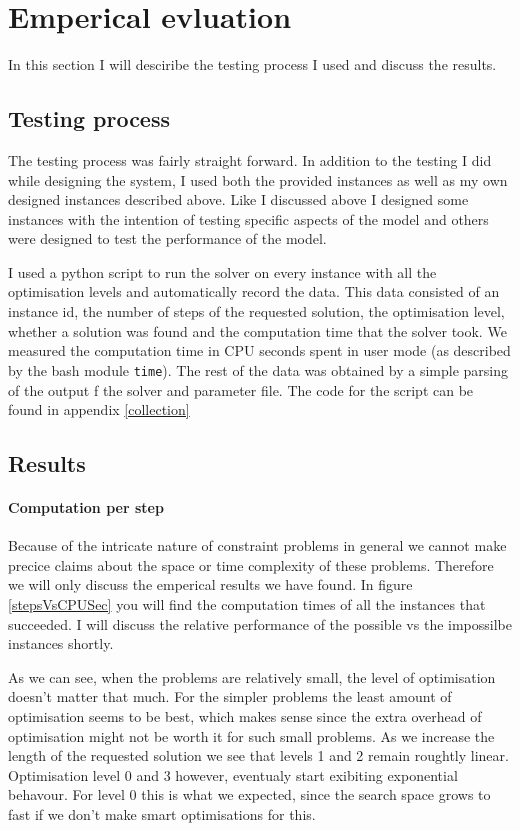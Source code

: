 \documentclass[british]{article}
\newcommand{\code}[1]{\texttt{#1}}
\begin{document}
\section{Emperical evluation}
\label{results}
In this section I will desciribe the testing process I used and discuss the results. 

\subsection{Testing process}
\label{testing}
The testing process was fairly straight forward. In addition to the testing I did while designing the system, I used both the provided instances as well as my own designed instances described above. Like I discussed above I designed some instances with the intention of testing specific aspects of the model and others were designed to test the performance of the model. 

I used a python script to run the solver on every instance with all the optimisation levels and automatically record the data. This data consisted of an instance id, the number of steps of the requested solution, the optimisation level, whether a solution was found and the computation time that the solver took. We measured the computation time in CPU seconds spent in user mode (as described by the bash module \code{time}).  The rest of the data was obtained by a simple parsing of the output f the solver and parameter file. The code for the script can be found in appendix \ref{collection}

\subsection{Results}
\paragraph{Computation per step}
 Because of the intricate nature of constraint problems in general we cannot make precice claims about the space or time complexity of these problems. Therefore we will only discuss the emperical results we have found. In figure \ref{stepsVsCPUSec} you will find the computation times of all the instances that succeeded. I will discuss the relative performance of the possible vs the impossilbe instances shortly. 
 
 As we can see, when the problems are relatively small, the level of optimisation doesn't matter that much. For the simpler problems the least amount of optimisation seems to be best, which makes sense since the extra overhead of optimisation might not be worth it for such small problems. As we increase the length of the requested solution we see that levels 1 and 2 remain roughtly linear. Optimisation level 0 and 3 however, eventualy start exibiting exponential behavour. For level 0 this is what we expected, since the search space grows to fast if we don't make smart optimisations for this.
  
\end{document}
